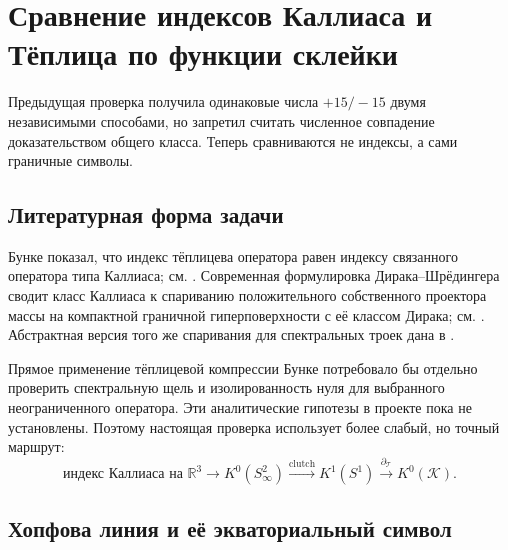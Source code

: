 \chapter{Сравнение индексов Каллиаса и Тёплица по функции склейки}

Предыдущая проверка получила одинаковые числа $+15/-15$ двумя независимыми
способами, но запретил считать численное совпадение доказательством общего
класса. Теперь сравниваются не индексы, а сами граничные символы.

\section{Литературная форма задачи}

Бунке показал, что индекс тёплицева оператора равен индексу связанного
оператора типа Каллиаса; см. . Современная
формулировка Дирака--Шрёдингера сводит класс Каллиаса к спариванию
положительного собственного проектора массы на компактной граничной
гиперповерхности с её классом Дирака; см. .
Абстрактная версия того же спаривания для спектральных троек дана в
.

Прямое применение тёплицевой компрессии Бунке потребовало бы отдельно
проверить спектральную щель и изолированность нуля для выбранного
неограниченного оператора. Эти аналитические гипотезы в проекте пока не
установлены. Поэтому настоящая проверка использует более слабый, но точный
маршрут:
\begin{equation}
 \text{индекс Каллиаса на }\mathbb R^3
 \longrightarrow K^0(S^2_\infty)
 \xrightarrow{\mathrm{clutch}}
 K^1(S^1)
 \xrightarrow{\partial_{\mathcal T}}
 K^0(\mathcal K).
 \label{eq:v6-callias-toeplitz-route}
\end{equation}

\section{Хопфова линия и её экваториальный символ}

